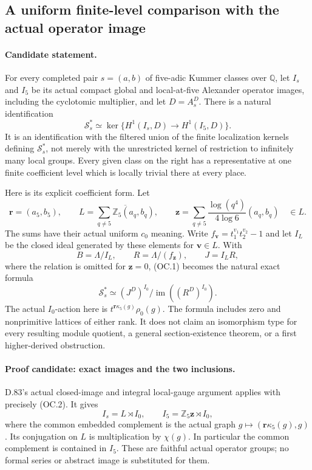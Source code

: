 \subsection{A uniform finite-level comparison with the actual operator image}

\paragraph{Candidate statement.}
For every completed pair \(s=(a,b)\) of five-adic Kummer classes
over \(\mathbb Q\), let \(I_s\) and \(I_5\) be its actual
compact global and local-at-five Alexander operator images,
including the cyclotomic multiplier, and let \(D=A_s^D\).
There is a natural identification
\[
 \mathcal S_s^*\simeq
 \ker\{H^1(I_s,D)\longrightarrow H^1(I_5,D)\}.       \tag{OC.1}
\]
It is an identification with the filtered union of the finite
localization kernels defining \(\mathcal S_s^*\), not merely
with the unrestricted kernel of restriction to infinitely many
local groups. Every given class on the right has a representative
at one finite coefficient level which is locally trivial there
at every place.

Here is its explicit coefficient form. Let
\[
 \mathbf r=(a_5,b_5),\qquad
 L=\overline{\sum_{q\ne5}\mathbb Z_5(a_q,b_q)},\qquad
 \mathbf z=\sum_{q\ne5}\frac{\log(q^4)}{4\log6}(a_q,b_q)
                                                     \quad\in L.
                                                               \tag{OC.2}
\]
The sums have their actual uniform \(c_0\) meaning. Write
\(f_{\mathbf v}=t_1^{v_1}t_2^{v_2}-1\) and let \(I_L\)
be the closed ideal generated by these elements for
\(\mathbf v\in L\). With
\[
 B=\Lambda/I_L,\qquad R=\Lambda/(f_{\mathbf z}),
                 \qquad J=I_LR,
                                                               \tag{OC.3}
\]
where the relation is omitted for \(\mathbf z=0\), (OC.1)
becomes the natural exact formula
\[
 \mathcal S_s^*\simeq
       (J^D)^{I_0}/\operatorname{im}((R^D)^{I_0}).       \tag{OC.4}
\]
The actual \(I_0\)-action here is
\(t^{\mathbf r\kappa_5(g)}\rho_0(g)\). The formula
includes zero and nonprimitive lattices of either rank.
It does not claim an isomorphism type for every resulting
module quotient, a general section-existence theorem, or a
first higher-derived obstruction.

\paragraph{Proof candidate: exact images and the two inclusions.}
D.83's actual closed-image and integral local-gauge argument
applies with precisely (OC.2). It gives
\[
 I_s=L\rtimes I_0,\qquad
 I_5=\mathbb Z_5\mathbf z\rtimes I_0,                 \tag{OC.5}
\]
where the common embedded complement is the actual graph
\(g\mapsto(\mathbf r\kappa_5(g),g)\). Its conjugation on
\(L\) is multiplication by \(\chi(g)\).
In particular the common complement is contained in \(I_5\).
These are faithful actual operator groups; no formal series
or abstract image is substituted for them.

